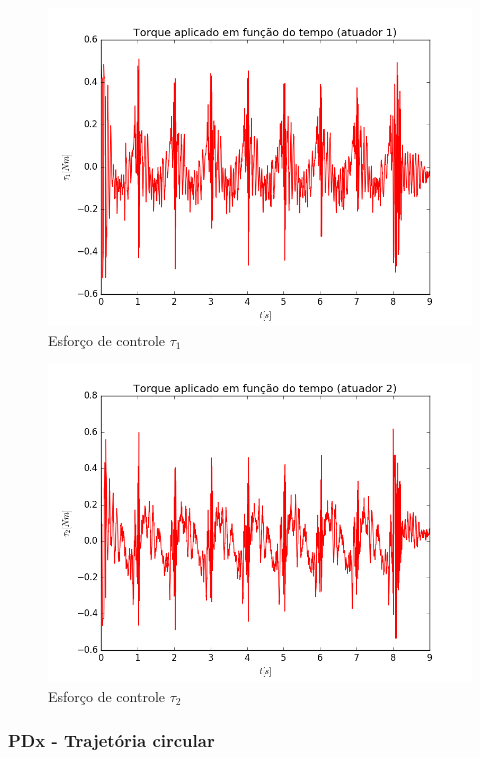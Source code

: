 \documentclass[]{politex}
\begin{document}
\begin{multicols}{2}
\begin{figure}[H]
	\centering
	\includegraphics[scale=0.39]{../../../Experimental/Aquisicoes/SMCt_circulo/tau1.png}  
	\caption{Esforço de controle $\tau_1$}
	\label{fig:SMCq_circulo_tau1}
\end{figure}
\begin{figure}[H]
	\centering
	\includegraphics[scale=0.39]{../../../Experimental/Aquisicoes/SMCt_circulo/tau2.png}  
	\caption{Esforço de controle $\tau_2$}
	\label{fig:SMCq_circulo_tau2}
\end{figure}
\end{multicols}


\subsubsection{PDx - Trajetória circular}
\end{document}
